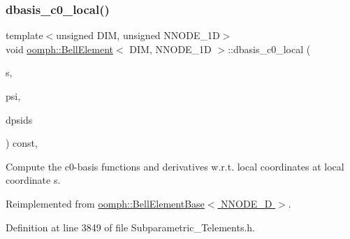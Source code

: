 \mbox{\label{classoomph_1_1BellElement_a3a7b703738e3de182b26b299626d869a}} 
\subsubsection{\texorpdfstring{dbasis\+\_\+c0\+\_\+local()}{dbasis\_c0\_local()}}
{\footnotesize\ttfamily template$<$unsigned D\+IM, unsigned N\+N\+O\+D\+E\+\_\+1D$>$ \\
void \hyperlink{classoomph_1_1BellElement}{oomph\+::\+Bell\+Element}$<$ D\+IM, N\+N\+O\+D\+E\+\_\+1D $>$\+::dbasis\+\_\+c0\+\_\+local (\begin{DoxyParamCaption}\item[{const \hyperlink{classoomph_1_1Vector}{Vector}$<$ double $>$ \&}]{s,  }\item[{\hyperlink{classoomph_1_1Shape}{Shape} \&}]{psi,  }\item[{\hyperlink{classoomph_1_1DShape}{D\+Shape} \&}]{dpsids }\end{DoxyParamCaption}) const\hspace{0.3cm}{\ttfamily [inline]}, {\ttfamily [virtual]}}



Compute the c0-\/basis functions and derivatives w.\+r.\+t. local coordinates at local coordinate s. 



Reimplemented from \hyperlink{classoomph_1_1BellElementBase_ae863013db88be8402457a77eb5d5862f}{oomph\+::\+Bell\+Element\+Base$<$ N\+N\+O\+D\+E\+\_\+D $>$}.



Definition at line 3849 of file Subparametric\+\_\+\+Telements.\+h.

\mbox{\label{classoomph_1_1BellElement_aeeceae57e24c50d838e993fd92c8bc68}} 

